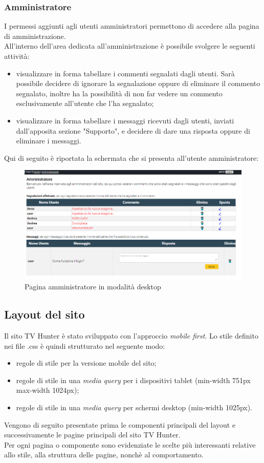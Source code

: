 \subsubsection{Amministratore}
I permessi aggiunti agli utenti amministratori permettono di accedere alla pagina di amministrazione.\\
All'interno dell'area dedicata all'amministrazione è possibile svolgere le seguenti attività:
\begin{itemize}
	\item visualizzare in forma tabellare i commenti segnalati dagli utenti. Sarà possibile decidere di ignorare la segnalazione oppure di eliminare il commento segnalato, inoltre ha la possibilità di non far vedere un commento esclusivamente all'utente che l'ha segnalato;
	\item visualizzare in forma tabellare i messaggi ricevuti dagli utenti, inviati dall'apposita sezione "Supporto", e decidere di dare una risposta oppure di eliminare i messaggi.
\end{itemize}
Qui di seguito è riportata la schermata che si presenta all'utente amministratore:
\begin{figure}[h!]
	\centerline{\includegraphics[scale=0.45]{img/amministratore.png}}
	\caption{Pagina amministratore in modalità desktop}
	\label{fig:navbarGU}
\end{figure}


\subsection{Layout del sito}
Il sito TV Hunter è stato sviluppato con l'approccio \textit{mobile first}. Lo stile definito nei file .css è quindi strutturato nel seguente modo:
\begin{itemize}
	\item regole di stile per la versione mobile del sito;
	\item regole di stile in una \textit{media query} per i dispositivi tablet (min-width 751px max-width 1024px);
	\item regole di stile in una \textit{media query} per schermi desktop (min-width 1025px).
\end{itemize}
Vengono di seguito presentate prima le componenti principali del layout e successivamente le pagine principali del sito TV Hunter. \\
Per ogni pagina o componente sono evidenziate le scelte più interessanti relative allo stile, alla struttura delle pagine, nonchè al comportamento.

